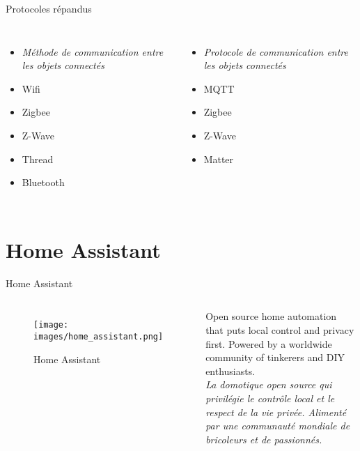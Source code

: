 \documentclass[aspectratio=169,xcolor=dvipsnames]{beamer}
\begin{document}
\begin{frame}{Protocoles répandus}
    \begin{columns}[c] %

        \begin{itemize}
            \item \textit{Méthode de communication entre les objets connectés}
            \item Wifi
            \item Zigbee
            \item Z-Wave
            \item Thread
            \item Bluetooth
        \end{itemize}

        \begin{itemize}
            \item \textit{Protocole de communication entre les objets connectés}
            \item MQTT
            \item Zigbee
            \item Z-Wave
            \item Matter
        \end{itemize}

    \end{columns}
\end{frame}

\section{Home Assistant}

\begin{frame}{Home Assistant}
    \begin{columns}[c] %

        \begin{figure}
            \texttt{[image: images/home\_assistant.png]}
            \captionsetup{labelformat=empty}
            \caption{Home Assistant}
        \end{figure}
        Open source home automation that puts local control and privacy first. Powered by a worldwide community of tinkerers and DIY enthusiasts. \\
        \vspace{0.3cm}
        \textit{La domotique open source qui privilégie le contrôle local et le respect de la vie privée. Alimenté par une communauté mondiale de bricoleurs et de passionnés.}

    \end{columns}
\end{frame}
\end{document}
